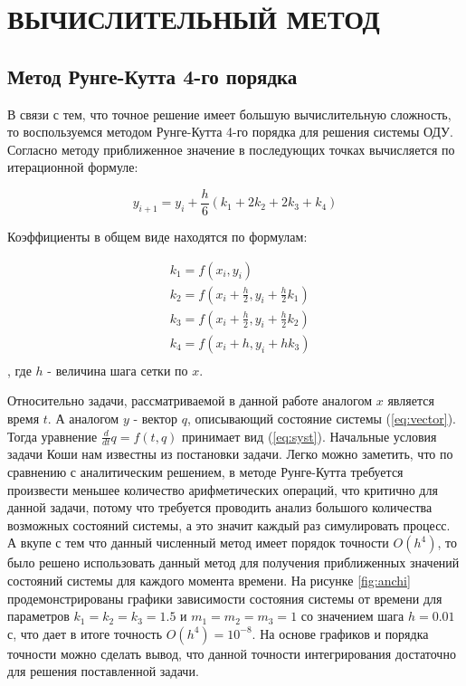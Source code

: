 \chapter{ВЫЧИСЛИТЕЛЬНЫЙ МЕТОД}
\section{Метод Рунге-Кутта 4-го порядка}

 В связи с тем, что точное решение имеет большую вычислительную сложность, то воспользуемся методом Рунге-Кутта 4-го порядка для решения системы ОДУ\cite{BahvalJidkovKobel1987}. Согласно методу приближенное значение в последующих точках вычисляется по итерационной формуле:

\begin{equation}
	y_{i+1} = y_i + \frac{h}{6} (k_1 + 2 k_2 + 2 k_3 + k_4)
\end{equation} 

Коэффициенты в общем виде находятся по формулам:

\begin{align}
	&k_1= f(x_i, y_i)\\
	&k_2=f(x_i + \frac{h}{2}, y_i + \frac{h}{2}k_1)\\
	&k_3=f(x_i + \frac{h}{2}, y_i + \frac{h}{2}k_2)\\
	&k_4 =  f(x_i + h, y_i + h k_3)\\
\end{align}, где $h$ - величина шага сетки по $x$.

Относительно задачи, рассматриваемой в данной работе аналогом $x$ является время $t$. А аналогом $y$ - вектор $q$, описывающий состояние системы  (\ref{eq:vector}). Тогда уравнение $\frac{d}{dt}q = f(t, q)$ принимает вид (\ref{eq:syst}). Начальные условия задачи Коши нам известны из постановки задачи. 
Легко можно заметить, что по сравнению с аналитическим решением, в методе Рунге-Кутта требуется произвести меньшее количество арифметических операций, что критично для данной задачи, потому что требуется проводить анализ большого количества возможных состояний системы, а это значит каждый раз симулировать процесс. А вкупе с тем что данный численный метод имеет порядок точности $O(h^4)$, то было решено использовать данный метод для получения приближенных значений состояний системы для каждого момента времени. На рисунке \ref{fig:anchi} продемонстрированы графики зависимости состояния системы от времени для параметров $k_1 = k_2 = k_3 = 1.5$ и $m_1 = m_2 = m_3 = 1$ со значением шага $h=0.01$с, что дает в итоге точность $O(h^4) = 10^{-8}$. На основе графиков и порядка точности можно сделать вывод, что данной точности интегрирования достаточно для решения поставленной задачи.

